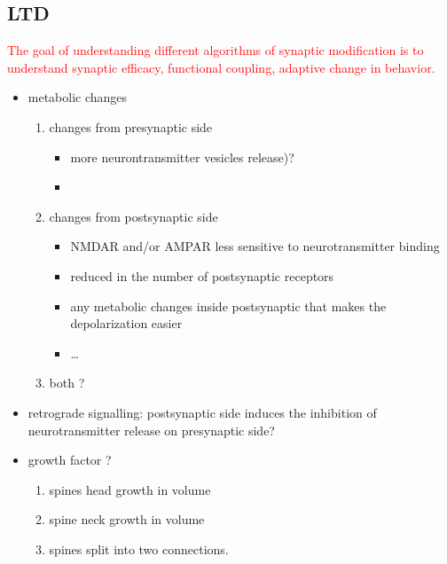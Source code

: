 \subsection{LTD}



\textcolor{red}{The goal of understanding different algorithms of synaptic
modification is to understand synaptic efficacy, functional coupling, adaptive
change in behavior.}
\begin{itemize}
  \item metabolic changes
\begin{enumerate}
  \item changes from presynaptic side
  
  \begin{itemize}
    \item  more neurontransmitter vesicles
  release)? 
  
     \item 
  \end{itemize}
  
  \item changes from postsynaptic side 
  
  \begin{itemize}
    \item NMDAR and/or AMPAR less sensitive to  neurotransmitter binding
  
  
     \item reduced in the number of postsynaptic receptors
     
     \item any metabolic changes inside postsynaptic that makes the depolarization easier
     
     \item \ldots
  \end{itemize}
  
  \item both ?
\end{enumerate}

  \item retrograde signalling: postsynaptic side induces the inhibition
  of neurotransmitter release on presynaptic side?
  
  \item growth factor ?
  \begin{enumerate}
    \item spines head growth in volume
    \item spine neck growth in volume
    \item spines split into two connections.
  \end{enumerate}
\end{itemize}

